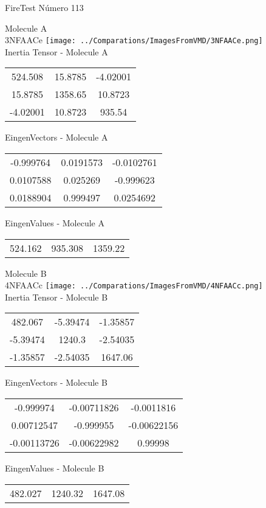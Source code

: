 \vtab[-2cm]
\begin{center}
{\large FireTest \tab Número 113}
\end{center}
\begin{multicols}{2}
\begin{center}

Molecule A \\ 
3NFAACe
\texttt{[image: ../Comparations/ImagesFromVMD/3NFAACe.png]}
\\
Inertia Tensor - Molecule A \\
\vtab

\begin{tabular}{|c c c|}
524.508	 & 	15.8785	 & 	-4.02001	 \\
15.8785	 & 	1358.65	 & 	10.8723	 \\
-4.02001	 & 	10.8723	 & 	935.54
\end{tabular}

\vtab
 EingenVectors - Molecule A     \\
\vtab
\begin{tabular}{|c c c|}
-0.999764	 & 	0.0191573	 & 	-0.0102761	 \\
0.0107588	 & 	0.025269	 & 	-0.999623	 \\
0.0188904	 & 	0.999497	 & 	0.0254692
\end{tabular}

\vtab
 EingenValues - Molecule A     \\
\vtab
\begin{tabular}{|c c c|}
524.162	 & 	935.308	 & 	1359.22	 \\
\end{tabular}
\columnbreak

Molecule B \\ 
4NFAACc
\texttt{[image: ../Comparations/ImagesFromVMD/4NFAACc.png]}
\\
Inertia Tensor - Molecule B \\
\vtab

\begin{tabular}{|c c c|}
482.067	 & 	-5.39474	 & 	-1.35857	 \\
-5.39474	 & 	1240.3	 & 	-2.54035	 \\
-1.35857	 & 	-2.54035	 & 	1647.06
\end{tabular}

\vtab
 EingenVectors - Molecule B     \\
\vtab
\begin{tabular}{|c c c|}
-0.999974	 & 	-0.00711826	 & 	-0.0011816	 \\
0.00712547	 & 	-0.999955	 & 	-0.00622156	 \\
-0.00113726	 & 	-0.00622982	 & 	0.99998
\end{tabular}

\vtab
 EingenValues - Molecule B     \\
\vtab
\begin{tabular}{|c c c|}
482.027	 & 	1240.32	 & 	1647.08	 \\
\end{tabular}

\end{center}
\end{multicols}
